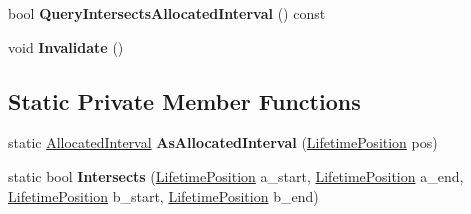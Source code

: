 \begin{DoxyCompactItemize}
\item 
bool {\bfseries Query\+Intersects\+Allocated\+Interval} () const \hypertarget{classv8_1_1internal_1_1compiler_1_1_live_range_conflict_iterator_a3c4e8aff037bf89e8e1dec0491c75ccb}{}\label{classv8_1_1internal_1_1compiler_1_1_live_range_conflict_iterator_a3c4e8aff037bf89e8e1dec0491c75ccb}

\item 
void {\bfseries Invalidate} ()\hypertarget{classv8_1_1internal_1_1compiler_1_1_live_range_conflict_iterator_a334250e34e757b2cce6e7b556aa59519}{}\label{classv8_1_1internal_1_1compiler_1_1_live_range_conflict_iterator_a334250e34e757b2cce6e7b556aa59519}

\end{DoxyCompactItemize}
\subsection*{Static Private Member Functions}
\begin{DoxyCompactItemize}
\item 
static \hyperlink{structv8_1_1internal_1_1compiler_1_1_allocated_interval}{Allocated\+Interval} {\bfseries As\+Allocated\+Interval} (\hyperlink{classv8_1_1internal_1_1compiler_1_1_lifetime_position}{Lifetime\+Position} pos)\hypertarget{classv8_1_1internal_1_1compiler_1_1_live_range_conflict_iterator_ae1ba02fd710404f19b863e8ea4b2dc63}{}\label{classv8_1_1internal_1_1compiler_1_1_live_range_conflict_iterator_ae1ba02fd710404f19b863e8ea4b2dc63}

\item 
static bool {\bfseries Intersects} (\hyperlink{classv8_1_1internal_1_1compiler_1_1_lifetime_position}{Lifetime\+Position} a\+\_\+start, \hyperlink{classv8_1_1internal_1_1compiler_1_1_lifetime_position}{Lifetime\+Position} a\+\_\+end, \hyperlink{classv8_1_1internal_1_1compiler_1_1_lifetime_position}{Lifetime\+Position} b\+\_\+start, \hyperlink{classv8_1_1internal_1_1compiler_1_1_lifetime_position}{Lifetime\+Position} b\+\_\+end)\hypertarget{classv8_1_1internal_1_1compiler_1_1_live_range_conflict_iterator_af30573917ffa30be404ae05783f91ee5}{}\label{classv8_1_1internal_1_1compiler_1_1_live_range_conflict_iterator_af30573917ffa30be404ae05783f91ee5}

\end{DoxyCompactItemize}
